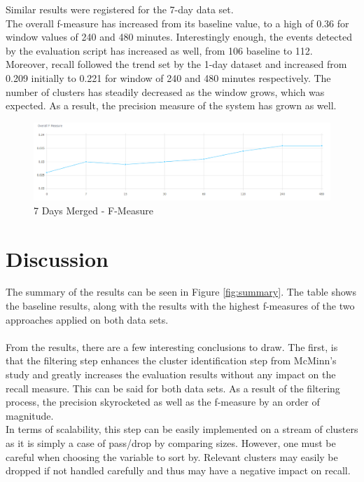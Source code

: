 \documentclass[a4paper,portrait,12pt]{article}
\begin{document}
\begin{enumerate}
		  Similar results were registered for the 7-day data set. \\
		  The overall f-measure has increased from its baseline value, to a high of 0.36 for window values of 240 and 480 minutes.
		  Interestingly enough, the events detected by the evaluation script has increased as well, from 106 baseline to 112.
		  \\
		  Moreover, recall followed the trend set by the 1-day dataset and increased from 0.209 initially to 0.221 for window of 240 and 480 minutes respectively. 
		  The number of clusters has steadily decreased as the window grows, which was expected.
		  As a result, the precision measure of the system has grown as well.
	      \begin{figure}[h!]
		      \centering
		      \includegraphics[width=\linewidth]{images/7days-merged-f-measure.png}
		      \caption{7 Days Merged - F-Measure}
		      \label{fig:7days-merged-f-measure}
	      \end{figure}
\end{enumerate}

\section{Discussion}
\label{section-discussion}

The summary of the results can be seen in Figure \ref{fig:summary}.
The table shows the baseline results, along with the results with the highest f-measures of the two approaches applied on both data sets.\\
\\
From the results, there are a few interesting conclusions to draw. 
The first, is that the filtering step enhances the cluster identification step from McMinn's study \cite{McMinn2013} and greatly increases the evaluation results without any impact on the recall measure.
This can be said for both data sets.
As a result of the filtering process, the precision skyrocketed as well as the f-measure by an order of magnitude. \\
In terms of scalability, this step can be easily implemented on a stream of clusters as it is simply a case of pass/drop by comparing sizes.
However, one must be careful when choosing the variable to sort by.
Relevant clusters may easily be dropped if not handled carefully and thus may have a negative impact on recall.
\end{document}
